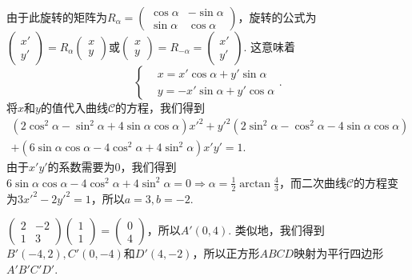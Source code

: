 \begin{solution}
  由于此旋转的矩阵为$R_\alpha=\begin{pmatrix}
    \cos\alpha & -\sin\alpha \\
    \sin\alpha & \cos\alpha
  \end{pmatrix}$，旋转的公式为$\begin{pmatrix}
    x' \\
    y'
  \end{pmatrix}=R_\alpha\begin{pmatrix}
    x \\
    y
  \end{pmatrix}$或$\begin{pmatrix}
    x \\
    y
  \end{pmatrix}=R_{-\alpha}=\begin{pmatrix}
    x' \\
    y'
  \end{pmatrix}$. 这意味着
  \[
    \left\{
      \begin{aligned}
        & x = x'\cos\alpha + y'\sin\alpha \\
        & y = -x'\sin\alpha + y'\cos\alpha
      \end{aligned}
    \right. .
  \]
  将$x$和$y$的值代入曲线$\mathscr C$的方程，我们得到
  \begin{multline*}
    (2\cos^2\alpha - \sin^2\alpha + 4\sin\alpha\cos\alpha)x'^2 + y'^2(2\sin^2\alpha - \cos^2\alpha - 4\sin\alpha\cos\alpha) \\
    + (6\sin\alpha\cos\alpha - 4\cos^2\alpha + 4\sin^2\alpha)x'y'=1.
  \end{multline*}
  由于$x'y'$的系数需要为0，我们得到$6\sin\alpha\cos\alpha - 4\cos^2\alpha + 4\sin^2\alpha=0\Rightarrow\alpha
  =\frac12\arctan\frac43$，而二次曲线$\mathscr C$的方程变为$3x'^2-2y'^2=1$，所以$a=3,b=-2$.
\end{solution}

\begin{solution}
  $\begin{pmatrix}
    2 & -2 \\
    1 & 3
  \end{pmatrix}\begin{pmatrix}
    1 \\
    1
  \end{pmatrix}=\begin{pmatrix}
    0 \\
    4
  \end{pmatrix}$，所以$A'(0,4)$. 类似地，我们得到$B'(-4,2),C'(0,-4)$和$D'(4,-2)$，所以正方形$ABCD$映射为平行四边形$A'B'C'D'$.
\end{solution}

